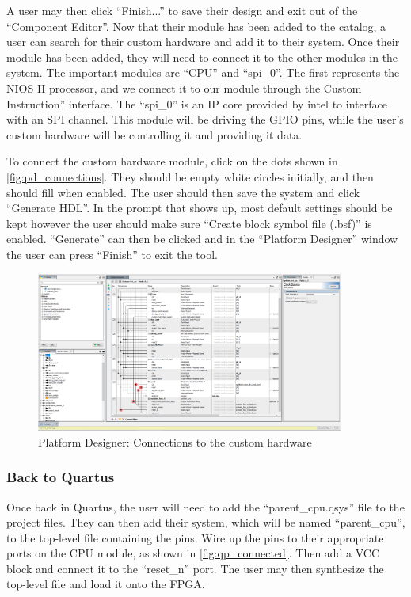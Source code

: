 A user may then click “Finish...” to save their design and exit out of the “Component Editor”. Now that their module has been added to the catalog, a user can search for their custom hardware and add it to their system. Once their module has been added, they will need to connect it to the other modules in the system. The important modules are “CPU” and “spi\_0”. The first represents the NIOS II processor, and we connect it to our module through the Custom Instruction” interface. The “spi\_0” is an IP core provided by intel to interface with an SPI channel. This module will be driving the GPIO pins, while the user's custom hardware will be controlling it and providing it data.

To connect the custom hardware module, click on the dots shown in \autoref{fig:pd_connections}. They should be empty white circles initially, and then should fill when enabled. The user should then save the system and click “Generate HDL”. In the prompt that shows up, most default settings should be kept however the user should make sure “Create block symbol file (.bsf)” is enabled. “Generate” can then be clicked and in the “Platform Designer” window the user can press “Finish” to exit the tool.

\begin{figure}[!htb]
    \centering
    \includegraphics[width=0.9\textwidth]{05_evaluation/images/pd_connections.png}
    \caption{Platform Designer: Connections to the custom hardware}
    \label{fig:pd_connections}
\end{figure}

\subsubsection{Back to Quartus}

Once back in Quartus, the user will need to add the “parent\_cpu.qsys” file to the project files. They can then add their system, which will be named “parent\_cpu”, to the top-level file containing the pins. Wire up the pins to their appropriate ports on the CPU module, as shown in \autoref{fig:qp_connected}. Then add a VCC block and connect it to the “reset\_n” port. The user may then synthesize the top-level file and load it onto the FPGA.

